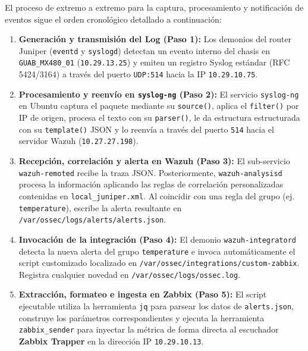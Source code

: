 El proceso de extremo a extremo para la captura, procesamiento y notificación de eventos sigue el orden cronológico detallado a continuación:

\begin{enumerate}
    \item \textbf{Generación y transmisión del Log (Paso 1):}
    Los demonios del router Juniper (\texttt{eventd} y \texttt{syslogd}) detectan un evento interno del chasis en \texttt{GUAB\_MX480\_01} (\texttt{10.29.13.25}) y emiten un registro Syslog estándar (RFC 5424/3164) a través del puerto \texttt{UDP:514} hacia la IP \texttt{10.29.10.75}.

    \item \textbf{Procesamiento y reenvío en \texttt{syslog-ng} (Paso 2):}
    El servicio \texttt{syslog-ng} en Ubuntu captura el paquete mediante su \texttt{source()}, aplica el \texttt{filter()} por IP de origen, procesa el texto con su \texttt{parser()}, le da estructura estructurada con su \texttt{template()} JSON y lo reenvía a través del puerto \texttt{514} hacia el servidor Wazuh (\texttt{10.27.27.198}).

    \item \textbf{Recepción, correlación y alerta en Wazuh (Paso 3):}
    El sub-servicio \texttt{wazuh-remoted} recibe la traza JSON. Posteriormente, \texttt{wazuh-analysisd} procesa la información aplicando las reglas de correlación personalizadas contenidas en \texttt{local\_juniper.xml}. Al coincidir con una regla del grupo (ej. \texttt{temperature}), escribe la alerta resultante en \texttt{/var/ossec/logs/alerts/alerts.json}.

    \item \textbf{Invocación de la integración (Paso 4):}
    El demonio \texttt{wazuh-integratord} detecta la nueva alerta del grupo \texttt{temperature} e invoca automáticamente el script customizado localizado en \texttt{/var/ossec/integrations/custom-zabbix}. Registra cualquier novedad en \texttt{/var/ossec/logs/ossec.log}.

    \item \textbf{Extracción, formateo e ingesta en Zabbix (Paso 5):}
    El script ejecutable utiliza la herramienta \texttt{jq} para parsear los datos de \texttt{alerts.json}, construye los parámetros correspondientes y ejecuta la herramienta \texttt{zabbix\_sender} para inyectar la métrica de forma directa al escuchador \textbf{Zabbix Trapper} en la dirección IP \texttt{10.29.10.13}.
\end{enumerate}

